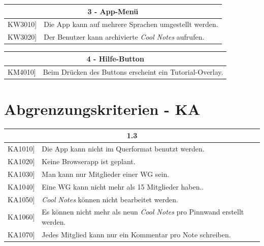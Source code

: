 \documentclass[a4paper]{scrreprt}
\begin{document}
		\vspace{5mm}
		
		\begin{table}[h!]
			\centering
			\label{my-label}
			\begin{tabular}{p{2cm}p{12cm}}
				
				\multicolumn{2}{c}{\textbf{3 - App-Menü}} \\ \hline
				\centering{[}KW3010{]} & Die App kann auf mehrere Sprachen umgestellt werden.\\
				\centering{[}KW3020{]} & Der Benutzer kann archivierte \textit{Cool Notes} aufrufen.\\
				\hline
			\end{tabular}
		\end{table}
		
		\vspace{5mm}
		
		\begin{table}[h!]
			\centering
			\label{my-label}
			\begin{tabular}{p{2cm}p{12cm}}
				
				\multicolumn{2}{c}{\textbf{4 - Hilfe-Button}} \\ \hline
				\centering{[}KM4010{]} & Beim Drücken des Buttons erscheint ein Tutorial-Overlay.\\
				
				
				\hline
			\end{tabular}
		\end{table}
	
		\vspace{1cm}
		
        \section{Abgrenzungskriterien - KA}
        
        \begin{table}[h!]
        	\centering
        	\label{my-label}
        	\begin{tabular}{p{2cm}p{12cm}}
        		
        		\multicolumn{2}{c}{\textbf{1.3}} \\ \hline
        		\centering{[}KA1010{]} & Die App kann nicht im Querformat benutzt werden.\\
        		\centering{[}KA1020{]}& Keine Browserapp ist geplant.                                 \\
        		\centering{[}KA1030{]}& Man kann nur Mitglieder einer WG sein.\\ 
        		\centering{[}KA1040{]}& Eine WG kann nicht mehr als 15 Mitglieder haben..\\ 
        		\centering{[}KA1050{]}& \textit{Cool Notes} können nicht bearbeitet werden.\\ 
        		\centering{[}KA1060{]}& Es können nicht mehr als neun \textit{Cool Notes} pro Pinnwand erstellt werden.\\ 
        		\centering{[}KA1070{]}& Jedes Mitglied kann nur ein Kommentar pro Note schreiben.\\ 
        		\hline
        	\end{tabular}
        \end{table}
\end{document}
